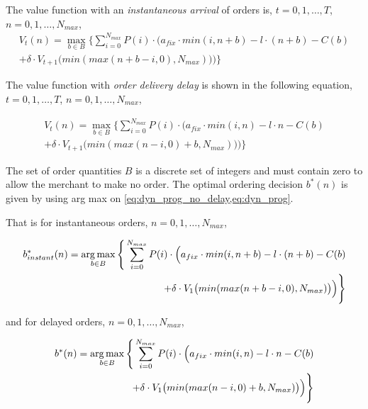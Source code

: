 The value function with an \textit{instantaneous arrival} of orders is, $t=0,1,\ldots,T$, $n=0,1,\ldots,N_{max}$,
\begin{equation}
\begin{split}
V_t(n) = \max_{b \in B} \Bigg\{
\sum_{i = 0}^{N_{max}}
P(i) \cdot \Big(
a_{fix} \cdot min(i, n + b) %
- l \cdot (n + b) %
- C(b) %
 \\
+ \delta \cdot V_{t+1}\big(min(max(n + b - i, 0), N_{max})\big)
\Big)\Bigg\}
\end{split}
\label{eq:dyn_prog_no_delay}
\end{equation}

The value function with \textit{order delivery delay} is shown in the following equation, $t=0,1,\ldots,T$, $n=0,1,\ldots,N_{max}$,

\begin{equation}
\begin{split}
V_t(n) = \max_{b \in B} \Bigg\{
	\sum_{i = 0}^{N_{max}} 
		P(i) \cdot \Big(
			a_{fix} \cdot min(i, n) %
			- l \cdot n %
			- C(b) %
		 \\
		+ \delta \cdot V_{t+1}\big(min(max(n - i, 0) + b, N_{max})\big)
	\Big)\Bigg\}
\end{split}
\label{eq:dyn_prog}
\end{equation}

The set of order quantities $B$ is a discrete set of integers and must contain zero to allow the merchant to make no order.
The optimal ordering decision $b^*(n)$ is given by using arg max on \cref{eq:dyn_prog_no_delay,eq:dyn_prog}.

That is for instantaneous orders, $n=0,1,\ldots,N_{max}$,

\begin{equation}
\begin{split}
b^*_{instant}(n) = \argmax_{b \in B} \Bigg\{
\sum_{i = 0}^{N_{max}}
P(i) \cdot \Big(
a_{fix} \cdot min(i, n + b) %
- l \cdot (n + b) %
- C(b) %
\\
+ \delta \cdot V_{1}\big(min(max(n + b - i, 0), N_{max})\big)
\Big)\Bigg\}
\end{split}
\label{eq:optimal_order_instant}
\end{equation}

and for delayed orders, $n=0,1,\ldots,N_{max}$,

\begin{equation}
\begin{split}
b^*(n) = \argmax_{b \in B} \Bigg\{
\sum_{i = 0}^{N_{max}} 
P(i) \cdot \Big(
a_{fix} \cdot min(i, n) %
- l \cdot n %
- C(b) %
 \\
+ \delta \cdot V_{1}\big(min(max(n - i, 0) + b, N_{max})\big)
\Big)\Bigg\}
\end{split}
\label{eq:optimal_order}
\end{equation}

